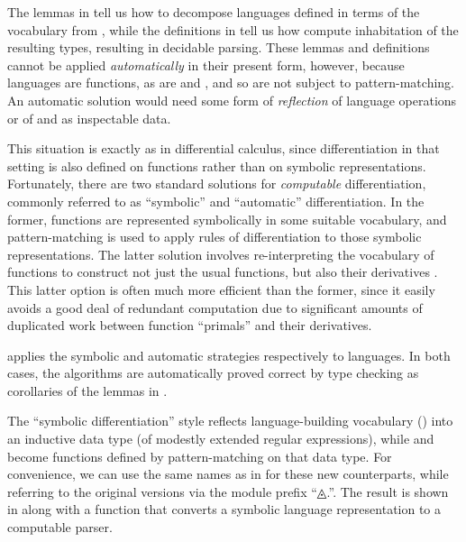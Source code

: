 \documentclass[acmsmall,screen,anonymous,timestamp]{acmart}
\begin{document}


The lemmas in  tell us how to decompose languages defined in terms of the vocabulary from , while the definitions in  tell us how compute inhabitation of the resulting types, resulting in decidable parsing.
These lemmas and definitions cannot be applied \emph{automatically} in their present form, however, because languages are functions, as are  and , and so are not subject to pattern-matching.
An automatic solution would need some form of \emph{reflection} of language operations or of  and  as inspectable data.

This situation is exactly as in differential calculus, since differentiation in that setting is also defined on functions rather than on symbolic representations.
Fortunately, there are two standard solutions for \emph{computable} differentiation, commonly referred to as ``symbolic'' and ``automatic'' differentiation.
In the former, functions are represented symbolically in some suitable vocabulary, and pattern-matching is used to apply rules of differentiation to those symbolic representations.
The latter solution involves re-interpreting the vocabulary of functions to construct not just the usual functions, but also their derivatives \citep{Griewank89onAD, GriewankWalther2008EvalDerivs, Elliott-2018-ad-icfp}.
This latter option is often much more efficient than the former, since it easily avoids a good deal of redundant computation due to significant amounts of duplicated work between function ``primals'' and their derivatives.

 applies the symbolic and automatic strategies respectively to languages.
In both cases, the algorithms are automatically proved correct by type checking as corollaries of the lemmas in .

\rnc{}

\nc{}

The ``symbolic differentiation'' style reflects language-building vocabulary () into an inductive data type (of modestly extended regular expressions), while  and  become functions defined by pattern-matching on that data type.
For convenience, we can use the same names as in  for these new counterparts, while referring to the original versions via the module prefix ``{◬.}\hspace{0.05em}''.
The result is shown in  along with a function {} that converts a symbolic language representation to a computable parser.
\end{document}
